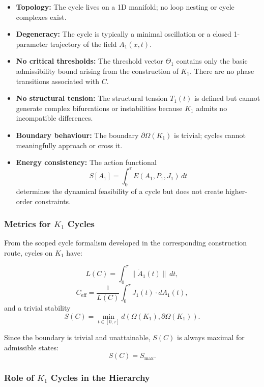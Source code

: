 \begin{itemize}
  \item \textbf{Topology:}  
        The cycle lives on a 1D manifold; no loop nesting or cycle
        complexes exist.

  \item \textbf{Degeneracy:}  
        The cycle is typically a minimal oscillation or a closed
        1-parameter trajectory of the field $A_1(x,t)$.

  \item \textbf{No critical thresholds:}  
        The threshold vector $\Theta_1$ contains only the basic
        admissibility bound arising from the construction of $K_1$.
        There are no phase transitions associated with $C$.

  \item \textbf{No structural tension:}  
        The structural tension
        $T_1(t)$ is defined but cannot generate complex bifurcations or
        instabilities because $K_1$ admits no incompatible differences.

  \item \textbf{Boundary behaviour:}  
        The boundary $\partial\Omega(K_1)$ is trivial; cycles cannot
        meaningfully approach or cross it.

  \item \textbf{Energy consistency:}  
        The action functional
        \[
          S[A_1] = \int_0^\tau E(A_1,P_1,J_1)\, dt
        \]
        determines the dynamical feasibility of a cycle but does not
        create higher-order constraints.
\end{itemize}

\subsubsection{Metrics for \texorpdfstring{$K_1$}{K_1} Cycles}

From the scoped cycle formalism developed in the corresponding construction route, cycles on $K_1$
have:

\[
  L(C) = \int_0^\tau \| \dot{A}_1(t) \|\, dt,
\]
\[
  C_{\mathrm{eff}} =
    \frac{1}{L(C)} \int_0^\tau J_1(t)\cdot dA_1(t),
\]
and a trivial stability
\[
  S(C) = \min_{t\in[0,\tau]} d(\Omega(K_1),\partial\Omega(K_1)).
\]

Since the boundary is trivial and unattainable, $S(C)$ is always
maximal for admissible states:
\[
  S(C) = S_{\max}.
\]

\subsubsection{Role of \texorpdfstring{$K_1$}{K_1} Cycles in the Hierarchy}


